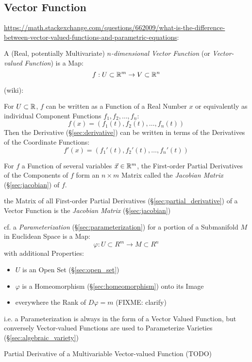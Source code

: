 \subsection{Vector Function}\label{sec:vector_function}

\url{https://math.stackexchange.com/questions/662009/what-is-the-difference-between-vector-valued-functions-and-parametric-equations}:

A (Real, potentially Multivariate) \emph{$n$-dimensional Vector Function} (or
\emph{Vector-valued Function}) is a Map:
\[
  f : U \subset \mathbb{R}^m \rightarrow V \subset \mathbb{R}^n
\]

(wiki):

For $U \subset \mathbb{R}$, $f$ can be written as a Function of a Real Number $x$ or
equivalently as individual Component Functions $f_1, f_2, \ldots, f_n$:
\[
  f(x) = (f_1(t), f_2(t), \ldots, f_n(t))
\]
Then the Derivative (\S\ref{sec:derivative}) can be written in terms of the
Derivatives of the Coordinate Functions:
\[
  f'(x) = (f_1'(t), f_2'(t), \ldots, f_n'(t))
\]

For $f$ a Function of several variables $\vec{x} \in \mathbb{R}^m$, the First-order
Partial Derivatives of the Components of $f$ form an $n \times m$ Matrix called
the \emph{Jacobian Matrix} (\S\ref{sec:jacobian}) of $f$.

the Matrix of all First-order Partial Derivatives
(\S\ref{sec:partial_derivative}) of a Vector Function is the \emph{Jacobian
  Matrix} (\S\ref{sec:jacobian})

\fist cf. a \emph{Parameterization} (\S\ref{sec:parameterization}) for a
portion of a Submanifold $M$ in Euclidean Space is a Map:
\[
  \varphi : U \subset R^m \rightarrow M \subset R^n
\]
with additional Properties:
\begin{itemize}
  \item $U$ is an Open Set (\S\ref{sec:open_set})
  \item $\varphi$ is a Homeomorphism (\S\ref{sec:homeomorphism}) onto its Image
  \item everywhere the Rank of $D\varphi = m$ (FIXME: clarify)
\end{itemize}
i.e. a Parameterization is always in the form of a Vector Valued Function, but
conversely Vector-valued Functions are used to Parameterize Varieties
(\S\ref{sec:algebraic_variety}) %

Partial Derivative of a Multivariable Vector-valued Function (TODO)



